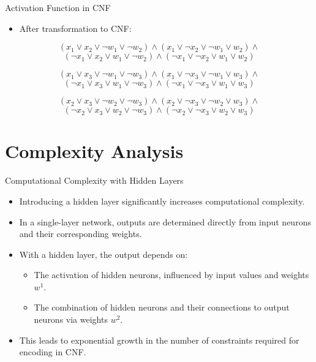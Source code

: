 \documentclass[12pt]{beamer}
\begin{document}
\begin{frame}{Activation Function in CNF}
\begin{itemize}
    \item After transformation to CNF:
\end{itemize}

\vspace{-0.4cm}

\centering

\[
(x_1 \vee x_2 \vee \neg w_1 \vee \neg w_2) \wedge 
(x_1 \vee \neg x_2 \vee \neg w_1 \vee w_2) \wedge 
\]
\[
(\neg x_1 \vee x_2 \vee w_1 \vee \neg w_2) \wedge 
(\neg x_1 \vee \neg x_2 \vee w_1 \vee w_2)
\]

 \wedge 
\vspace{-0.8cm} 

\[
(x_1 \vee x_3 \vee \neg w_1 \vee \neg w_3) \wedge 
(x_1 \vee \neg x_3 \vee \neg w_1 \vee w_3) \wedge 
\]
\[
(\neg x_1 \vee x_3 \vee w_1 \vee \neg w_3) \wedge 
(\neg x_1 \vee \neg x_3 \vee w_1 \vee w_3)
\]

 \wedge 
 \vspace{-0.8cm}

\[
(x_2 \vee x_3 \vee \neg w_2 \vee \neg w_3) \wedge 
(x_2 \vee \neg x_3 \vee \neg w_2 \vee w_3) \wedge 
\]
\[
(\neg x_2 \vee x_3 \vee w_2 \vee \neg w_3) \wedge 
(\neg x_2 \vee \neg x_3 \vee w_2 \vee w_3)
\]
\end{frame}

\section{Complexity Analysis}

\begin{frame}{Computational Complexity with Hidden Layers}
\begin{itemize}
    \item Introducing a hidden layer significantly increases computational complexity.
    \item In a single-layer network, outputs are determined directly from input neurons and their corresponding weights.
    \item With a hidden layer, the output depends on:
    \begin{itemize}
        \item The activation of hidden neurons, influenced by input values and weights \( w^1 \).
        \item The combination of hidden neurons and their connections to output neurons via weights \( w^2 \).
    \end{itemize}
    \item This leads to exponential growth in the number of constraints required for encoding in CNF.
\end{itemize}
\end{frame}
\end{document}
